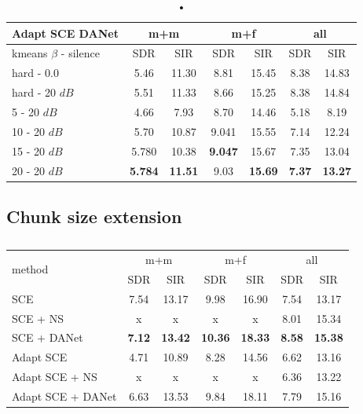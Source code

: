\documentclass[master, tikz, final,11pt, dvipdfmx]{iscs-thesis}
\begin{document}
\begin{table}[h!]
\centering
\begin{tabular}{l|c|c|c|c|c|c}
Adapt SCE DANet & \multicolumn{2}{c|}{m+m} & \multicolumn{2}{c|}{m+f} & \multicolumn{2}{c}{all} \\ 
\hline 
kmeans $\beta$ - silence & SDR & SIR & SDR & SIR & SDR & SIR \\ 
\hline
hard - 0.0  & 5.46 & 11.30 & 8.81 & 15.45 & 8.38 & 14.83 \\ 
hard - 20 $dB$  & 5.51 & 11.33 & 8.66 & 15.25 & 8.38 & 14.84 \\
\hline
\hline
5 - 20 $dB$  & 4.66 & 7.93 & 8.70 & 14.46 & 5.18 & 8.19 \\ 
10 - 20 $dB$  & 5.70 & 10.87 & 9.041 & 15.55 & 7.14 & 12.24 \\ 
15 - 20 $dB$ & 5.780 & 10.38 & \textbf{9.047} & 15.67 & 7.35 & 13.04 \\ 
20 - 20 $dB$ & \textbf{5.784} & \textbf{11.51} & 9.03 & \textbf{15.69} & \textbf{7.37} & \textbf{13.27} \\ 
\end{tabular}
\caption{•}
\label{table:AdaptSCEDANET}
\end{table}

\lipsum[1]


\subsection{Chunk size extension}
\label{ext}

\lipsum[1]

\begin{table}[h!]
\centering
\begin{tabular}{l|c|c|c|c|c|c}
\multirow{2}{*}{method} & \multicolumn{2}{c|}{m+m} & \multicolumn{2}{c|}{m+f} & \multicolumn{2}{c}{all} \\ 
\cline{2-7} 
 & SDR & SIR & SDR & SIR & SDR & SIR \\ 
\hline
SCE  & 7.54 & 13.17 & 9.98 & 16.90 & 7.54 & 13.17 \\
SCE + NS  & x & x & x & x & 8.01 & 15.34 \\
SCE + DANet  & \textbf{7.12} & \textbf{13.42} & \textbf{10.36} & \textbf{18.33} & \textbf{8.58} & \textbf{15.38} \\ 
\hline
\hline
Adapt SCE  & 4.71 & 10.89 & 8.28 & 14.56 & 6.62 & 13.16 \\
Adapt SCE + NS  & x & x & x & x & 6.36 & 13.22 \\
Adapt SCE + DANet  & 6.63 & 13.53 & 9.84 & 18.11 & 7.79 & 15.16 \\ 

\end{tabular}
\captionsetup{justification=centering}
\caption{}
\label{table:SCE400recap}
\end{table}
\end{document}
